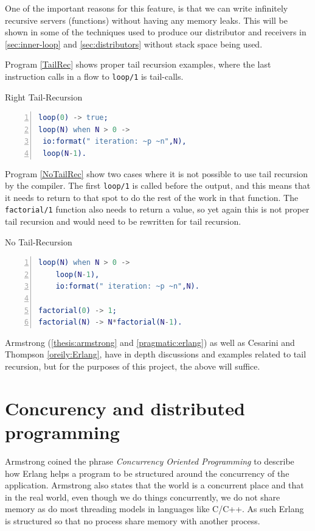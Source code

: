 \documentclass[a4paper,11pt]{report}
\begin{document}
 One of the important reasons for this feature, is that we can write
infinitely recursive servers (functions) without having any memory
leaks. This will be shown in some of the techniques used to produce
our distributor and receivers in \ref{sec:inner-loop} and
\ref{sec:distributors} without stack space being used.


 Program \ref{TailRec} shows proper tail recursion examples, where the last
instruction calls in a flow to \texttt{loop/1} is tail-calls.
\begin{Program}[H]
\caption{Right Tail-Recursion}
\label{TailRec}
\begin{lstlisting}[language=erlang,numbers=left]
loop(0) -> true;
loop(N) when N > 0 -> 
 io:format(" iteration: ~p ~n",N),
 loop(N-1).
\end{lstlisting}
\end{Program}

Program \ref{NoTailRec} show two cases where it is not possible to use
tail recursion by the compiler. The first \texttt{loop/1} is called
before the output, and this means that it needs to return to that
spot to do the rest of the work in that function. The
\texttt{factorial/1} function also needs to return a value, so yet
again this is not proper tail recursion and would need to be rewritten for
tail recursion. 
\begin{Program}[H]
\caption{No Tail-Recursion}
\label{NoTailRec}
\begin{lstlisting}[language=erlang,numbers=left]
loop(N) when N > 0 ->
	loop(N-1),
	io:format(" iteration: ~p ~n",N).

factorial(0) -> 1;
factorial(N) -> N*factorial(N-1).
\end{lstlisting}
\end{Program}

 Armstrong
(\ref{thesis:armstrong} and \ref{pragmatic:erlang}) as well as Cesarini and
Thompson \ref{oreily:Erlang}, have in depth discussions and examples
related to tail recursion, but for the purposes of this project, the
above will suffice.

\section{Concurency and distributed programming}


Armstrong\cite{thesis:armstrong} coined the phrase
\emph{Concurrency Oriented Programming} to describe how Erlang helps
a program to be structured around the concurrency of the
application. Armstrong\cite{book:armstrong} also states that the
world is a concurrent place and that in the real world, even though we
do things concurrently, we do not share memory as do most threading
models in languages like C/C++. As such Erlang is
structured so that no process share memory with another process.
\end{document}
